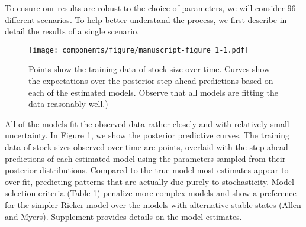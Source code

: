 \documentclass[author-year, 12pt,review]{components/elsarticle} %
\makeatletter
\def\maxwidth{\ifdim\Gin@nat@width>\linewidth\linewidth
\else\Gin@nat@width\fi}
\let\Oldincludegraphics\includegraphics
\renewcommand{\includegraphics}[1]{\Oldincludegraphics[width=\maxwidth]{#1}}
\makeatother
\begin{document}
To ensure our results are robust to the choice of parameters, we will
consider 96 different scenarios. To help better understand the process,
we first describe in detail the results of a single scenario.

\begin{figure}[htbp]
\centering
\texttt{[image: components/figure/manuscript-figure\_1-1.pdf]}
\caption{Points show the training data of stock-size over time. Curves
show the expectations over the posterior step-ahead predictions based on
each of the estimated models. Observe that all models are fitting the
data reasonably well.)}
\end{figure}

All of the models fit the observed data rather closely and with
relatively small uncertainty. In Figure 1, we show the posterior
predictive curves. The training data of stock sizes observed over time
are points, overlaid with the step-ahead predictions of each estimated
model using the parameters sampled from their posterior distributions.
Compared to the true model most estimates appear to over-fit, predicting
patterns that are actually due purely to stochasticity. Model selection
criteria (Table 1) penalize more complex models and show a preference
for the simpler Ricker model over the models with alternative stable
states (Allen and Myers). Supplement provides details on the model
estimates.
\end{document}
